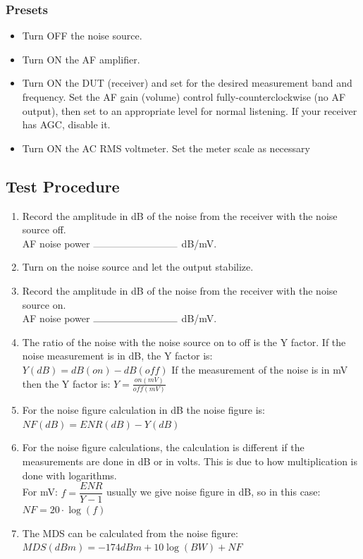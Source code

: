 \documentclass[10pt,letterpaper]{book}
\begin{document}
\subsubsection*{Presets}
\begin{itemize}
	\item Turn OFF the noise source.
	\item Turn ON the AF amplifier.
	\item Turn ON the DUT (receiver) and set for the desired measurement band and frequency. Set the AF gain (volume) control fully-counterclockwise (no AF output), then set to an appropriate level for normal listening. If your receiver has AGC, disable it.
	\item Turn ON the AC RMS voltmeter. Set the meter scale as necessary
\end{itemize}
\subsection*{Test Procedure}
\begin{enumerate}
\item  Record the amplitude in dB of the noise from the receiver with the noise source off.
	\vspace{30pt}
	\\AF noise power $\rule{3cm}{0.1mm}$ dB/mV.
	\item Turn on the noise source and let the output stabilize.
	\item Record the amplitude in dB of the noise from the receiver with the noise source on.
	\vspace{30pt}
	\\AF noise power $\rule{3cm}{0.1mm}$ dB/mV.
	\item The ratio of the noise with the noise source on to off is the Y factor. If the noise measurement is in dB, the Y factor is: $ Y(dB) = dB(on) - dB(off)$ If the measurement of the noise is in mV then the Y factor is: $ Y = \frac{on(mV)}{off(mV)} $
\item For the noise figure calculation in dB the noise figure is: $NF(dB) =  ENR(dB) - Y(dB) $
	\item For the noise figure calculations, the calculation is different if the measurements are done in dB or in volts. This is due to how multiplication is done with logarithms.\\
	
	For mV:  $ f = \dfrac{ENR}{Y-1} $ usually we give noise figure in dB, so in this case: $ NF = 20 \cdot \log(f) $
	\item The MDS can be calculated from the noise figure: $ MDS(dBm) = -174dBm + 10 \log(BW) + NF $ 
\end{enumerate}
\end{document}
